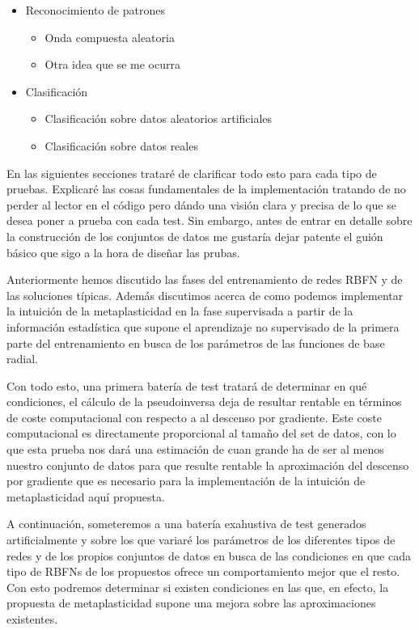 \documentclass[10pt,a4paper]{report}
\begin{document}
\begin{itemize}
	\item Reconocimiento de patrones
	\begin{itemize}
		\item Onda compuesta aleatoria
		\item Otra idea que se me ocurra
	\end{itemize}
	\item Clasificación
	\begin{itemize}
		\item Clasificación sobre datos aleatorios artificiales
		\item Clasificación sobre datos reales
	\end{itemize}
\end{itemize} 
En las siguientes secciones trataré de clarificar todo esto para cada tipo de pruebas. Explicaré las cosas fundamentales de la implementación tratando de no perder al lector en el código pero dándo una visión clara y precisa de lo que se desea poner a prueba con cada test. Sin embargo, antes de entrar en detalle sobre la construcción de los conjuntos de datos me gustaría dejar patente el guión básico que sigo a la hora de diseñar las prubas.

Anteriormente hemos discutido las fases del entrenamiento de redes RBFN y de las soluciones típicas. Además discutimos acerca de como podemos implementar la intuición de la metaplasticidad en la fase supervisada a partir de la información estadística que supone el aprendizaje no supervisado de la primera parte del entrenamiento en busca de los parámetros de las funciones de base radial. 

Con todo esto, una primera batería de test tratará de determinar en qué condiciones, el cálculo de la pseudoinversa deja de resultar rentable en términos de coste computacional con respecto a al descenso por gradiente. Este coste computacional es directamente proporcional al tamaño del set de datos, con lo que esta prueba nos dará una estimación de cuan grande ha de ser al menos nuestro conjunto de datos para que resulte rentable la aproximación del descenso por gradiente que es necesario para la implementación de la intuición de metaplasticidad aquí propuesta.

A continuación, someteremos a una batería exahustiva de test generados artificialmente y sobre los que variaré los parámetros de los diferentes tipos de redes y de los propios conjuntos de datos en busca de las condiciones en que cada tipo de RBFNs de los propuestos ofrece un comportamiento mejor que el resto. Con esto podremos determinar si existen condiciones en las que, en efecto, la propuesta de metaplasticidad supone una mejora sobre las aproximaciones existentes.
\end{document}
